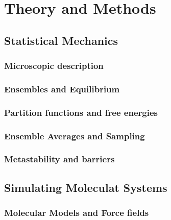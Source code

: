 \chapter{Theory and Methods}
\label{ch:theory-and-methods}

\section{Statistical Mechanics}

\lipsum[1][1-3]

\subsection{Microscopic description}

\lipsum[1][1-3]

\subsection{Ensembles and Equilibrium }

\lipsum[1][1-3]

\subsection{Partition functions and free energies}

\lipsum[1][1-3]

\subsection{Ensemble Averages and Sampling}

\lipsum[1][1-3]

\subsection{Metastability and barriers}

\lipsum[1][1-3]

\section{Simulating Moleculat Systems}

\lipsum[1][1-3]

\subsection{Molecular Models and Force fields}
\lipsum[1][1-3]


